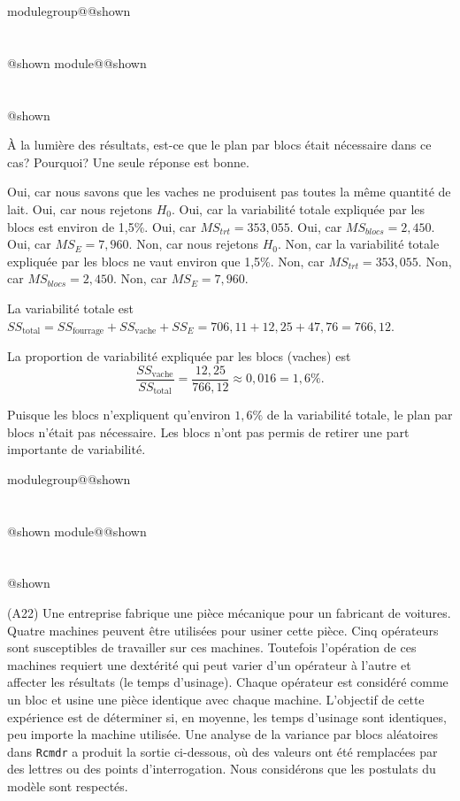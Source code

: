 \documentclass{Evaluation}
\makeatletter
\newcommand{\currentmodulekey}{}
\newcommand{\currentmoduletitle}{}
\newcommand{\currentgroupkey}{}
\newcommand{\currentgrouptitle}{}
\newcommand{\showmoduleifneeded}{%
  \ifx\currentgroupkey\empty\else
    \expandafter\ifx\csname modulegroup@\currentgroupkey @shown\endcsname\relax
      \section*{\currentgrouptitle}%
      \expandafter\gdef\csname modulegroup@\currentgroupkey @shown\endcsname{1}%
    \fi
  \fi
  \expandafter\ifx\csname module@\currentmodulekey @shown\endcsname\relax
    \section*{\currentmoduletitle}%
    \expandafter\gdef\csname module@\currentmodulekey @shown\endcsname{1}%
  \fi
}
\newenvironment{A22}{\showmoduleifneeded}{}
\newenvironment{H24}{\showmoduleifneeded}{}
\makeatother
\begin{document}
\begin{questions}
\begin{H24}
À la lumière des résultats, est-ce que le plan par blocs était nécessaire dans ce cas? Pourquoi? Une seule réponse est bonne.
\begin{checkboxes}
\choice Oui, car nous savons que les vaches ne produisent pas toutes la même quantité de lait.
\choice Oui, car nous rejetons $H_0$.
\choice Oui, car la variabilité totale expliquée par les blocs est environ de 1,5\%.
\choice Oui, car $MS_{trt}=353,055$.
\choice Oui, car $MS_{blocs}=2,450$.
\choice Oui, car $MS_{E}=7,960$.
\choice Non, car nous rejetons $H_0$.
\correctchoice Non, car la variabilité totale expliquée par les blocs ne vaut environ que 1,5\%.
\choice Non, car $MS_{trt}=353,055$.
\choice Non, car $MS_{blocs}=2,450$.
\choice Non, car $MS_{E}=7,960$.

\end{checkboxes}
\begin{solution}
La variabilité totale est $SS_{\text{total}} = SS_{\text{fourrage}} + SS_{\text{vache}} + SS_E = 706{,}11 + 12{,}25 + 47{,}76 = 766{,}12$.

La proportion de variabilité expliquée par les blocs (vaches) est
$$\frac{SS_{\text{vache}}}{SS_{\text{total}}} = \frac{12{,}25}{766{,}12} \approx 0{,}016 = 1{,}6\%.$$

Puisque les blocs n'expliquent qu'environ $1{,}6\%$ de la variabilité totale, le plan par blocs n'était pas nécessaire. Les blocs n'ont pas permis de retirer une part importante de variabilité.
\end{solution}
\end{H24}

\begin{A22}
\question
(A22) 
Une entreprise fabrique une pièce mécanique pour un fabricant de voitures. Quatre machines peuvent être utilisées pour usiner cette pièce. Cinq opérateurs sont susceptibles de travailler sur ces machines. Toutefois l'opération de ces machines requiert une  dextérité qui peut varier d'un opérateur à l'autre et affecter les résultats (le temps d'usinage). %
Chaque opérateur est considéré comme un bloc et usine une pièce identique avec chaque machine.
L'objectif de cette expérience est de déterminer si, en moyenne, les temps d'usinage sont identiques, peu importe la machine utilisée. Une analyse de la variance par blocs aléatoires dans \texttt{Rcmdr} a produit la sortie ci-dessous, où des valeurs ont été remplacées par des lettres ou des points d'interrogation. Nous considérons que les postulats 
 du modèle sont respectés.


\end{A22}
\end{questions}
\end{document}
